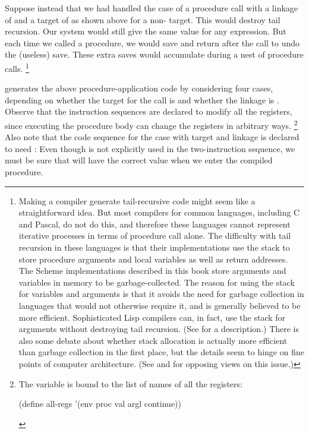 Suppose instead that we had handled the case of a procedure call with a linkage of  and a target of  as shown above for a non- target.
This would destroy tail recursion.
Our system would still give the same value for any expression.
But each time we called a procedure, we would save  and return after the call to undo the (useless) save.
These extra saves would accumulate during a nest of procedure calls.%
\footnote{
	Making a compiler generate tail-recursive code might seem like a straightforward idea.
	But most compilers for common languages, including C and Pascal, do not do this, and therefore these languages cannot represent iterative processes in terms of procedure call alone.
	The difficulty with tail recursion in these languages is that their implementations use the stack to store procedure arguments and local variables as well as return addresses.
	The Scheme implementations described in this book store arguments and variables in memory to be garbage-collected.
	The reason for using the stack for variables and arguments is that it avoids the need for garbage collection in languages that would not otherwise require it, and is generally believed to be more efficient.
	Sophisticated Lisp compilers can, in fact, use the stack for arguments without destroying tail recursion.
	(See  for a description.)
	There is also some debate about whether stack allocation is actually more efficient than garbage collection in the first place, but the details seem to hinge on fine points of computer architecture.
	(See \autocite{appel_garbage_faster_than_stack} and  for opposing views on this issue.)
}

 generates the above procedure-application code by considering four cases, depending on whether the target for the call is  and whether the linkage is .
Observe that the instruction sequences are declared to modify all the registers, since executing the procedure body can change the registers in arbitrary ways.%
\footnote{
	The variable  is bound to the list of names of all the registers:
	\begin{smallscheme}
	  (define all-regs '(env proc val argl continue))
	\end{smallscheme}
}
Also note that the code sequence for the case with target  and linkage  is declared to need :
Even though  is not explicitly used in the two-instruction sequence, we must be sure that  will have the correct value when we enter the compiled procedure.

